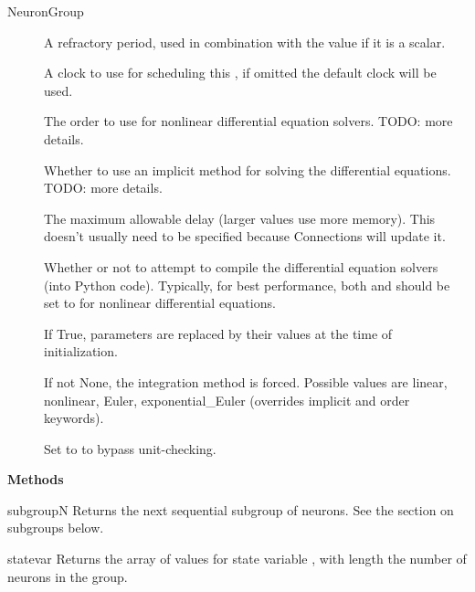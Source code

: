 \documentclass[letterpaper,10pt,english]{manual}
\begin{document}
\begin{classdesc}{NeuronGroup}
\begin{description}
\item[]
A refractory period, used in combination with the  value
if it is a scalar.

\item[]
A clock to use for scheduling this \hyperlink{brian.NeuronGroup}{}, if omitted the
default clock will be used.

\item[]
The order to use for nonlinear differential equation solvers.
TODO: more details.

\item[]
Whether to use an implicit method for solving the differential
equations. TODO: more details.

\item[]
The maximum allowable delay (larger values use more memory).
This doesn't usually need to be specified because Connections will update it.

\item[]
Whether or not to attempt to compile the differential equation
solvers (into Python code). Typically, for best performance, both 
and  should be set to  for nonlinear differential equations.

\item[]
If True, parameters are replaced by their values at the time
of initialization.

\item[]
If not None, the integration method is forced. Possible values are
linear, nonlinear, Euler, exponential\_Euler (overrides implicit and order
keywords).

\item[]
Set to  to bypass unit-checking.

\end{description}

\textbf{Methods}

\hypertarget{brian.NeuronGroup.subgroup}{}\begin{methoddesc}{subgroup}{N}
Returns the next sequential subgroup of  neurons. See
the section on subgroups below.
\end{methoddesc}

\hypertarget{brian.NeuronGroup.state}{}\begin{methoddesc}{state}{var}
Returns the array of values for state
variable , with length the number of neurons in the
group.
\end{methoddesc}


\end{classdesc}
\end{document}

